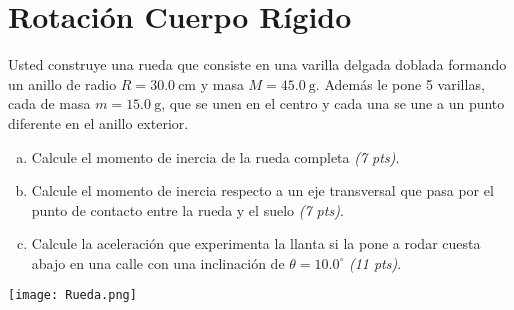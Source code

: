 \documentclass[
  12pt,
]{article}
\newcommand{\pts}[1]{ {\it (#1 pts)}}
\newcommand{\unit}[1]{\:\mathrm{#1}}
\begin{document}
\newpage
\section{Rotación Cuerpo Rígido}
Usted construye una rueda que consiste en una varilla delgada
doblada formando un anillo de radio $R = 30.0\unit{cm}$ y
masa $M = 45.0 \unit{g}$. Además le pone 5 varillas, cada
de masa $m = 15.0 \unit{g}$, que se unen en el centro y
cada una se une a un punto diferente en el anillo exterior.

\begin{enumerate}[a)]
  \item Calcule el momento de inercia de la rueda completa
    \pts{7}.
  \item Calcule el momento de inercia respecto a un eje 
    transversal que pasa por el punto de contacto entre 
    la rueda y el suelo \pts{7}.
  \item Calcule la aceleración que experimenta la 
    llanta si la pone a rodar cuesta abajo en una 
    calle con una inclinación de $\theta = 10.0^{\circ}$ 
    \pts{11}.
\end{enumerate}
\begin{center}
  \texttt{[image: Rueda.png]}
\end{center}
\end{document}

